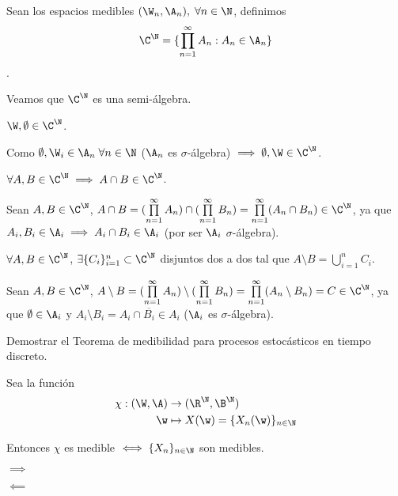\begin{sol}
  Sean los espacios medibles $(\W_n, \A_n), \; \forall n \in \N$, definimos $$\C^\N = \{\prod \limits^\infty_{n = 1} A_n : A_n \in \A_n \}$$.

  Veamos que $\C^\N$ es una semi-álgebra.
  \begin{nlist}
    \item $\W, \emptyset \in \C^\N$.

    Como $\emptyset, \W_i \in \A_n \; \forall n \in \N$ ($\A_n$ es $\sigma$-álgebra) $\implies \emptyset, \W \in \C^\N$.

    \item $\forall A, B \in \C^\N \implies A \cap B \in \C^\N$.

    Sean $A, B \in \C^\N$, $A \cap B = (\prod \limits^\infty_{n = 1} A_n) \cap (\prod \limits^\infty_{n = 1} B_n) = \prod \limits^\infty_{n = 1} (A_n \cap B_n) \in \C^\N$, ya que $A_i, B_i \in \A_i \implies A_i \cap B_i \in \A_i$ (por ser $\A_i$ $\sigma$-álgebra).

    \item $\forall A, B \in \C^\N$, $\exists \{C_i\}^n_{i = 1} \subset \C^\N$ disjuntos dos a dos tal que $A \setminus B = \bigcup \limits^n_{i = 1} C_i$.

    Sean $A, B \in \C^\N$, $A \setminus B = (\prod \limits^\infty_{n = 1} A_n) \setminus(\prod \limits^\infty_{n = 1} B_n) = \prod \limits^\infty_{n = 1} (A_n \setminus B_n) = C \in \C^\N$, ya que $\emptyset \in \A_i$ y $A_i \setminus B_i = A_i \cap \overline{B_i} \in A_i$ ($\A_i$ es $\sigma$-álgebra).
  \end{nlist}
\end{sol}

\begin{ejer}
  Demostrar el Teorema de medibilidad para procesos estocásticos en tiempo discreto.
\end{ejer}

\begin{sol}
  Sea la función \begin{align*}
    \chi : (\W, \A) & \to (\R^\N, \B^\N) \\
    \w & \mapsto X(\w) = \{X_n(\w)\}_{n \in \N}
  \end{align*}

  Entonces $\chi$ es medible $\iff \{X_n\}_{n \in \N}$ son medibles.

  $\boxed \implies$


  $\boxed \impliedby$
\end{sol}
